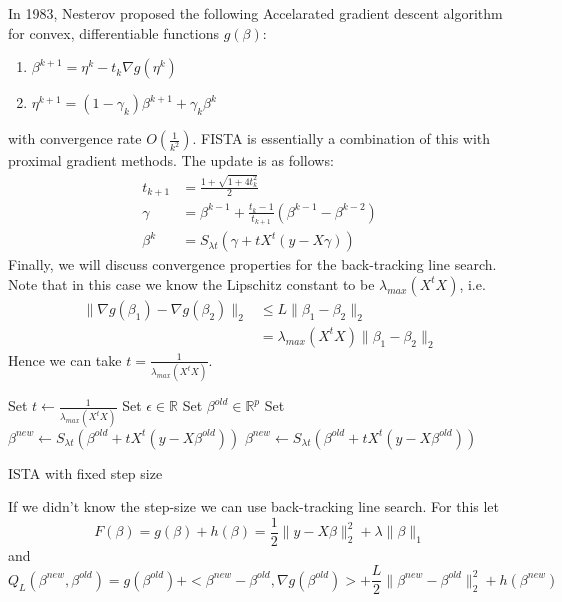 \documentclass[12pt, leqno]{article}
\providecommand{\norm}[1]{\lVert#1\rVert} %
\begin{document}
In 1983, Nesterov proposed the following Accelarated gradient descent algorithm for convex, differentiable functions $g(\beta)$:
\begin{enumerate}
\item $\beta^{k+1} = \eta^{k} - t_k \nabla g(\eta^k)$
\item $\eta^{k+1} = (1- \gamma_k) \beta^{k+1} + \gamma_k \beta^{k}$
\end{enumerate}
with convergence rate $O(\frac{1}{k^2})$. 
FISTA is essentially a combination of this with proximal gradient methods. The update is as follows:
\begin{align*}
t_{k+1} &= \frac{1 + \sqrt{1+4t_k^2}}{2} \\
\gamma &= \beta^{k-1} + \frac{t_k-1}{t_{k+1}} (\beta^{k-1} - \beta^{k-2}) \\
\beta^{k} &= S_{\lambda t} (\gamma + t X^t (y -
X \gamma)) 
\end{align*}
Finally, we will discuss convergence properties for the back-tracking
line search. Note that in this case we know the Lipschitz constant to be $\lambda_{max} (X^t X)$, i.e. 
\begin{align*}
\norm{\nabla g(\beta_1) - \nabla g(\beta_2)}_2 & \leq L \norm{\beta_1 - \beta_2}_2 \\
&= \lambda_{max}(X^t X) \norm{\beta_1 - \beta_2}_2
\end{align*}
Hence we can take $t = \frac{1}{\lambda_{max}(X^t X)}$.

\begin{algorithm}
\begin{algorithmic}
\State Set $t \gets \frac{1}{\lambda_{max}(X^t X)}$
\State Set $\epsilon \in \mathbb{R}$
\State Set $\beta^{old} \in \mathbb{R}^p$
\State Set $\beta^{new} \gets S_{\lambda t} (\beta^{old} + t X^t (y -
X \beta^{old}))$
\While {$\norm{\beta^{new} - \beta^{old}}_{\infty} \geq \epsilon$}
   \State $\beta^{new} \gets S_{\lambda t} (\beta^{old} + t X^t (y -
X \beta^{old}))$
    \EndWhile
\end{algorithmic}
\caption{ISTA with fixed step size}
\end{algorithm}

If we didn't know the step-size we can use back-tracking line search. For this let $$F(\beta) = g(\beta) + h(\beta) = \frac{1}{2}\norm{y- X \beta}_2^2 + \lambda \norm{\beta}_1$$
and 
$$
Q_L(\beta^{new},\beta^{old}) = g(\beta^{old}) + <\beta^{new} - \beta^{old}, \nabla g (\beta^{old})> + \frac{L}{2} \norm{\beta^{new}-\beta^{old}}_2^2 + h(\beta^{new})
$$
\end{document}
